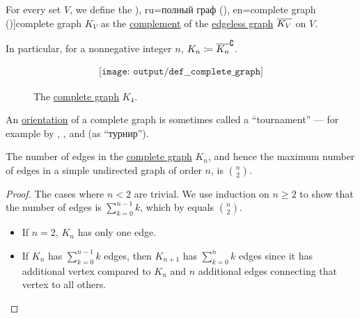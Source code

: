 \begin{definition}\label{def:complete_graph}\mimprovised
  For every set \( V \), we define the \term[bg=пълен граф (\cite[12]{Мирчев2001}), ru=полный граф (\cite[10]{Емеличев1990}), en=complete graph (\cite[def. 1.3.1]{Knauer2011})]{complete graph} \( K_V \) as the \hyperref[def:graph_complement]{complement} of the \hyperref[def:edgeless_graph]{edgeless graph} \( \oline{K_V} \) on \( V \).

  In particular, for a nonnegative integer \( n \), \( K_n \coloneqq \oline{K_n}^{\complement} \).

  \begin{figure}[!ht]
    \begin{equation}\label{eq:fig:def:complete_graph/k4}
      \begin{aligned}
        \texttt{[image: output/def\_\_complete\_graph]}
      \end{aligned}
    \end{equation}
    \caption{The \hyperref[def:complete_graph]{complete graph} \( K_4 \).}\label{fig:def:complete_graph/k4}
  \end{figure}
\end{definition}
\begin{comments}
  \item An \hyperref[def:graph_orientation]{orientation} of a complete graph is sometimes called a \enquote{tournament} --- for example by , ,  and  (as \enquote{турнир}).
\end{comments}

\begin{proposition}\label{thm:complete_graph_edge_count}
  The number of edges in the \hyperref[def:complete_graph]{complete graph} \( K_n \), and hence the maximum number of edges in a simple undirected graph of order \( n \), is \( \binom n 2 \).
\end{proposition}
\begin{proof}
  The cases where \( n < 2 \) are trivial. We use induction on \( n \geq 2 \) to show that the number of edges is \( \sum_{k=0}^{n-1} k \), which by  equals \( \binom n 2 \).

  \begin{itemize}
    \item If \( n = 2 \), \( K_n \) has only one edge.
    \item If \( K_n \) has \( \sum_{k=0}^{n-1} k \) edges, then \( K_{n+1} \) has \( \sum_{k=0}^n k \) edges since it has additional vertex compared to \( K_n \) and \( n \) additional edges connecting that vertex to all others.
  \end{itemize}
\end{proof}

